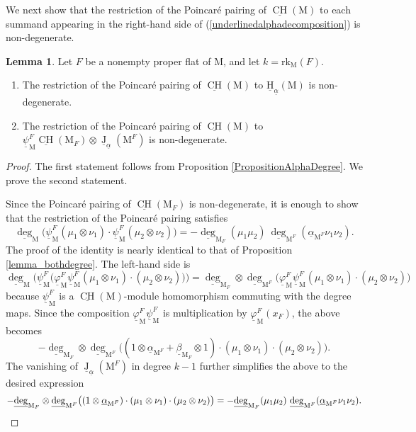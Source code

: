 \documentclass[11pt,reqno]{amsart}
\theoremstyle{definition}
\newtheorem{lemma}[theorem]{Lemma}
\theoremstyle{remark}
\renewcommand{\(}{\left(}
\renewcommand{\)}{\right)}
\newcommand{\<}{\left<}
\renewcommand{\>}{\right>}
\newcommand{\uJ}{\underline{\operatorname{J}}}
\newcommand{\CH}{\operatorname{CH}}
\newcommand{\uCH}{\underline{\CH}}
\newcommand{\upsi}{\underline{\psi}}
\newcommand{\uvarphi}{\underline{\varphi}}
\begin{document}
We next show that the restriction of the Poincar\'e pairing of $\uCH(\mathrm{M})$ to each summand appearing in the right-hand side of  (\ref{underlinedalphadecomposition}) is non-degenerate. 

\begin{lemma}
Let $F$ be a nonempty proper flat of $\mathrm{M}$, and let $k=\text{rk}_\mathrm{M}(F)$.
\begin{enumerate}[(1)]\itemsep 5pt
\item The restriction of the Poincar\'e pairing of $\uCH(\mathrm{M})$ to $\underline{\mathrm{H}}_{\underline{\alpha}}(\mathrm{M})$ is non-degenerate.
\item The restriction of the Poincar\'e pairing of $\uCH(\mathrm{M})$ to $\underline{\psi}^F_\mathrm{M} \uCH(\mathrm{M}_F)\otimes \uJ_{\underline{\alpha}}(\mathrm{M}^F)$ is non-degenerate.
\end{enumerate}
\end{lemma}

\begin{proof}
The first statement follows from Proposition \ref{PropositionAlphaDegree}.
We prove the second statement.

Since the Poincar\'e pairing of $\underline{\CH}(\mathrm{M}_F)$  is non-degenerate, it is enough to show that the restriction of the Poincar\'e pairing satisfies
\[
\underline\deg_{\mathrm{M}}\big(\upsi^F_\mathrm{M}(\mu_1\otimes \nu_1)\cdot \upsi^F_\mathrm{M}(\mu_2\otimes \nu_2) \big)
=-\underline\deg_{\mathrm{M}_F}(\mu_1 \mu_2)\ \underline\deg_{\mathrm{M}^F}(\underline\alpha_{\mathrm{M}^F}\nu_1\nu_2).
\]
The proof of the identity is nearly identical to that of Proposition \ref{lemma_bothdegree}.
The left-hand side is 
\[
\underline\deg_{\mathrm{M}}\big(\upsi^F_\mathrm{M} \big( \uvarphi^F_\mathrm{M}\upsi^F_\mathrm{M} (\mu_1\otimes \nu_1)\cdot (\mu_2\otimes \nu_2) \big) \big)
=
\underline\deg_{\mathrm{M}_F} \otimes \underline\deg_{\mathrm{M}^F}  \big( \uvarphi^F_\mathrm{M}\upsi^F_\mathrm{M} (\mu_1\otimes \nu_1)\cdot (\mu_2\otimes \nu_2) \big) 
\]
because $\upsi^F_\mathrm{M}$ is a $\uCH(\mathrm{M})$-module homomorphism commuting with the degree maps.
Since the composition $ \uvarphi^F_\mathrm{M}\upsi^F_\mathrm{M} $ is multiplication by $ \uvarphi^F_\mathrm{M}(x_F)$, the above becomes
\[
-\underline\deg_{\mathrm{M}_F} \otimes \underline\deg_{\mathrm{M}^F}  \big( (1 \otimes \underline{\alpha}_{\mathrm{M}^F} +\underline{\beta}_{\mathrm{M}_F} \otimes 1) \cdot (\mu_1\otimes \nu_1)\cdot (\mu_2\otimes \nu_2) \big).
\]
The vanishing of $\uJ_{\underline{\alpha}}(\mathrm{M}^F)$ in degree $k-1$
 further simplifies the above to the desired expression 
\[
-\underline\deg_{\mathrm{M}_F} \otimes \underline\deg_{\mathrm{M}^F}  \big( (1 \otimes \underline{\alpha}_{\mathrm{M}^F} ) \cdot (\mu_1\otimes \nu_1)\cdot (\mu_2\otimes \nu_2) \big) 
=-\underline\deg_{\mathrm{M}_F}(\mu_1 \mu_2)\ \underline\deg_{\mathrm{M}^F}(\underline\alpha_{\mathrm{M}^F}\nu_1\nu_2). \qedhere
\]
\end{proof}
\end{document}
